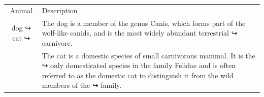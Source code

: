 \documentclass{article}
\begin{document}
 \begin{tabular}{cp{9cm}}
 Animal & Description \\
 dog
 ↪
 cat
 ↪
 & The dog is a member of the genus Canis, which forms
 part of the
 wolf-like canids, and is the most widely abundant
 terrestrial
 ↪
 carnivore. \\
 & The cat is a domestic species of small carnivorous
 mammal. It is the
 ↪
 only domesticated species in the family Felidae and
 is often referred
 to as the domestic cat to distinguish it from the
 wild members of the
 ↪
 family. \\
 \end{tabular}
 
\end{document}
